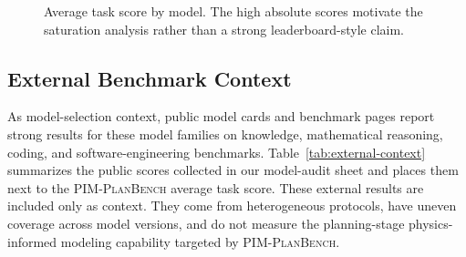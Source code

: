 \documentclass[11pt]{article}
\newcommand{\pimplanbench}{\textsc{PIM-PlanBench}}
\begin{document}
\begin{figure}[t]
\centering
{}
\caption{Average task score by model. The high absolute scores motivate the saturation analysis rather than a strong leaderboard-style claim.}
\label{fig:model-bars}
\end{figure}

\subsection{External Benchmark Context}

As model-selection context, public model cards and benchmark pages report strong results for these model families on knowledge, mathematical reasoning, coding, and software-engineering benchmarks. Table~\ref{tab:external-context} summarizes the public scores collected in our model-audit sheet and places them next to the \pimplanbench{} average task score. These external results are included only as context. They come from heterogeneous protocols, have uneven coverage across model versions, and do not measure the planning-stage physics-informed modeling capability targeted by \pimplanbench{}.
\end{document}
